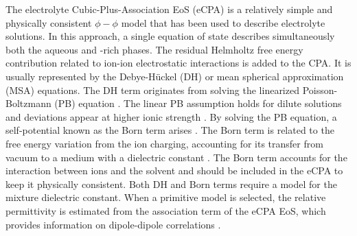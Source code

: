 The electrolyte Cubic-Plus-Association EoS (eCPA) \cite{Maribo2015} is a relatively simple and physically consistent $\phi-\phi$ model that has been used to describe electrolyte solutions. In this approach, a single equation of state describes simultaneously both the aqueous and -rich phases. The residual Helmholtz free energy contribution related to ion-ion electrostatic interactions is added to the CPA. It is usually represented by the Debye-Hückel (DH) or mean spherical approximation (MSA) equations. The DH term originates from solving the linearized Poisson-Boltzmann (PB) equation  \cite{Michelsen2004}.  The linear PB assumption holds for dilute solutions and deviations appear at higher ionic strength \cite{Debye1923}. 
By solving the PB equation, a self-potential known as the Born term arises \cite{Debye1923}. The Born term is related to the free energy variation from the ion charging, accounting for its transfer from vacuum to a medium with a dielectric constant \cite{Michelsen2004}. The Born term accounts for the interaction between ions and the solvent and should be included in the eCPA to keep it physically consistent. Both DH and Born terms require a model for the mixture dielectric constant. When a primitive model is selected, the relative permittivity is estimated from the association term of the eCPA EoS, which provides information on dipole-dipole correlations \cite{Maribo2013, Maribo2013a}. 


